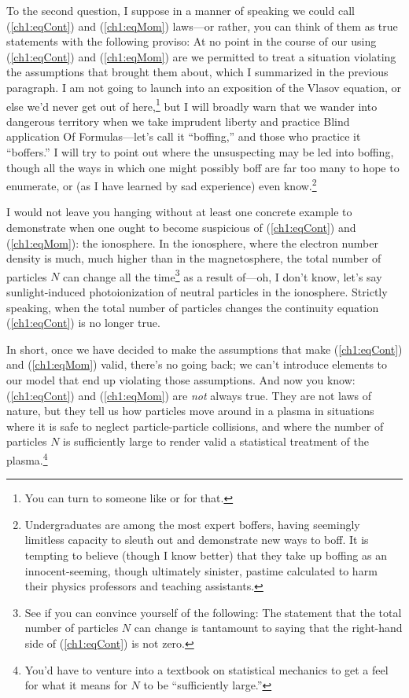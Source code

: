 To the second question, I suppose in a manner of speaking we could call
(\ref{ch1:eqCont}) and (\ref{ch1:eqMom}) laws---or rather, you can think of them
as true statements with the following proviso: At no point in the course of our
using (\ref{ch1:eqCont}) and (\ref{ch1:eqMom}) are we permitted to treat a
situation violating the assumptions that brought them about, which I summarized
in the previous paragraph. I am not going to launch into an exposition of the
Vlasov equation, or else we'd never get out of here,\footnote{You can turn to
  someone like \citet{Chen1974} or \citet{Bellan2008} for that.} but I will
broadly warn that we wander into dangerous territory when we take imprudent
liberty and practice Blind application Of Formulas---let's call it ``boffing,''
and those who practice it ``boffers.'' I will try to point out where the
unsuspecting may be led into boffing, though all the ways in which one might
possibly boff are far too many to hope to enumerate, or (as I have learned by
sad experience) even know.\footnote{Undergraduates are among the most expert
  boffers, having seemingly limitless capacity to sleuth out and demonstrate new
  ways to boff. It is tempting to believe (though I know better) that they take
  up boffing as an innocent-seeming, though ultimately sinister, pastime
  calculated to harm their physics professors and teaching assistants.}

I would not leave you hanging without at least one concrete example to
demonstrate when one ought to become suspicious of (\ref{ch1:eqCont}) and
(\ref{ch1:eqMom}): the ionosphere. In the ionosphere, where the electron number
density is much, much higher than in the magnetosphere, the total number of
particles $N$ can change all the time\footnote{See if you can convince yourself
  of the following: The statement that the total number of particles $N$ can
  change is tantamount to saying that the right-hand side of (\ref{ch1:eqCont})
  is not zero.} as a result of---oh, I don't know, let's say sunlight-induced
photoionization of neutral particles in the ionosphere. Strictly speaking, when
the total number of particles changes the continuity equation (\ref{ch1:eqCont})
is no longer true.

In short, once we have decided to make the assumptions that make
(\ref{ch1:eqCont}) and (\ref{ch1:eqMom}) valid, there's no going back; we can't
introduce elements to our model that end up violating those assumptions. And now
you know: (\ref{ch1:eqCont}) and (\ref{ch1:eqMom}) are \emph{not} always
true. They are not laws of nature, but they tell us how particles move around in
a plasma in situations where it is safe to neglect particle-particle collisions,
and where the number of particles $N$ is sufficiently large to render valid a
statistical treatment of the plasma.\footnote{You'd have to venture into a
  textbook on statistical mechanics to get a feel for what it means for $N$ to
  be ``sufficiently large.''}

